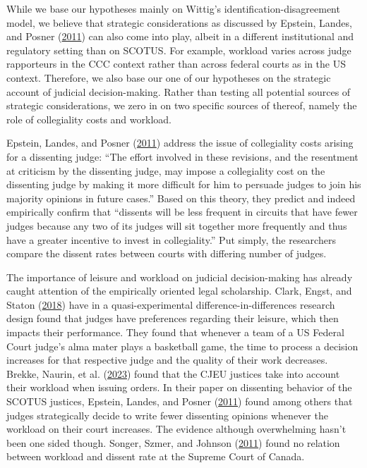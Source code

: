 \documentclass[
  11pt,
]{article}
\begin{document}
While we base our hypotheses mainly on Wittig's
identification-disagreement model, we believe that strategic
considerations as discussed by Epstein, Landes, and Posner
(\protect\hyperlink{ref-epsteinWhyWhenJudges2011}{2011}) can also come
into play, albeit in a different institutional and regulatory setting
than on SCOTUS. For example, workload varies across judge rapporteurs in
the CCC context rather than across federal courts as in the US context.
Therefore, we also base our one of our hypotheses on the strategic
account of judicial decision-making. Rather than testing all potential
sources of strategic considerations, we zero in on two specific sources
of thereof, namely the role of collegiality costs and workload.

Epstein, Landes, and Posner
(\protect\hyperlink{ref-epsteinWhyWhenJudges2011}{2011}) address the
issue of collegiality costs arising for a dissenting judge: ``The effort
involved in these revisions, and the resentment at criticism by the
dissenting judge, may impose a collegiality cost on the dissenting judge
by making it more difficult for him to persuade judges to join his
majority opinions in future cases.'' Based on this theory, they predict
and indeed empirically confirm that ``dissents will be less frequent in
circuits that have fewer judges because any two of its judges will sit
together more frequently and thus have a greater incentive to invest in
collegiality.'' Put simply, the researchers compare the dissent rates
between courts with differing number of judges.

The importance of leisure and workload on judicial decision-making has
already caught attention of the empirically oriented legal scholarship.
Clark, Engst, and Staton
(\protect\hyperlink{ref-clarkEstimatingEffectLeisure2018}{2018}) have in
a quasi-experimental difference-in-differences research design found
that judges have preferences regarding their leisure, which then impacts
their performance. They found that whenever a team of a US Federal Court
judge's alma mater plays a basketball game, the time to process a
decision increases for that respective judge and the quality of their
work decreases. Brekke, Naurin, et al.
(\protect\hyperlink{ref-brekkeThatOrderHow2023}{2023}) found that the
CJEU justices take into account their workload when issuing orders. In
their paper on dissenting behavior of the SCOTUS justices, Epstein,
Landes, and Posner
(\protect\hyperlink{ref-epsteinWhyWhenJudges2011}{2011}) found among
others that judges strategically decide to write fewer dissenting
opinions whenever the workload on their court increases. The evidence
although overwhelming hasn't been one sided though. Songer, Szmer, and
Johnson
(\protect\hyperlink{ref-songerExplainingDissentSupreme2011}{2011}) found
no relation between workload and dissent rate at the Supreme Court of
Canada.
\end{document}
